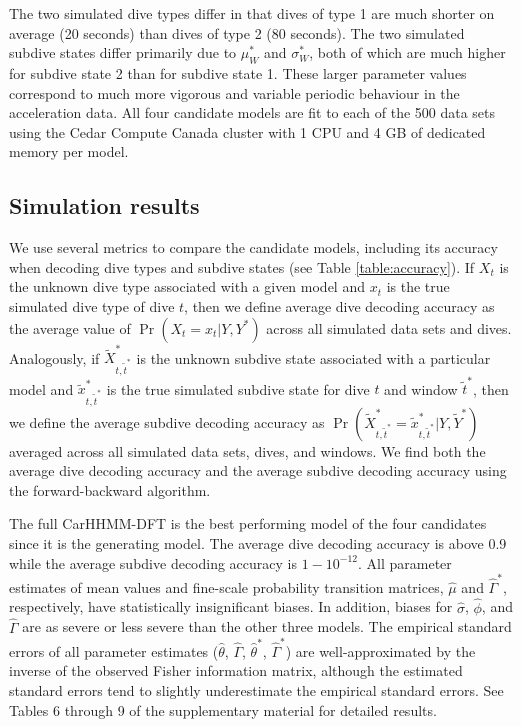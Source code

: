 The two simulated dive types differ in that dives of type 1 are much shorter on average (20 seconds) than dives of type 2 (80 seconds). The two simulated subdive states differ primarily due to $\mu_W^*$ and $\sigma_W^*$, both of which are much higher for subdive state 2 than for subdive state 1. These larger parameter values correspond to much more vigorous and variable periodic behaviour in the acceleration data. All four candidate models are fit to each of the 500 data sets using the Cedar Compute Canada cluster with 1 CPU and 4 GB of dedicated memory per model.

\subsection{Simulation results}

We use several metrics to compare the candidate models, including its accuracy when decoding dive types and subdive states (see Table \ref{table:accuracy}). If $X_t$ is the unknown dive type associated with a given model and $x_t$ is the true simulated dive type of dive $t$, then we define average dive decoding accuracy as the average value of $\Pr(X_{t} = x_{t}|Y,Y^*)$ across all simulated data sets and dives. Analogously, if $\tilde X^*_{t,\tilde t^*}$ is the unknown subdive state associated with a particular model and $\tilde x^*_{t,\tilde t^*}$ is the true simulated subdive state for dive $t$ and window $\tilde t^*$, then we define the average subdive decoding accuracy as $\Pr(\tilde X^*_{t,\tilde t^*} = \tilde x^*_{t,\tilde t^*}|Y,\tilde Y^*)$ averaged across all simulated data sets, dives, and windows. We find both the average dive decoding accuracy and the average subdive decoding accuracy using the forward-backward algorithm.

The full CarHHMM-DFT is the best performing model of the four candidates since it is the generating model. The average dive decoding accuracy is above 0.9 while the average subdive decoding accuracy is $1-10^{-12}$. All parameter estimates of mean values and fine-scale probability transition matrices, $\hat \mu$ and $\hat \Gamma^*$, respectively, have statistically insignificant biases. In addition, biases for $\hat \sigma$, $\hat \phi$, and $\hat \Gamma$ are as severe or less severe than the other three models. The empirical standard errors of all parameter estimates ($\hat \theta$, $\hat \Gamma$, $\hat \theta^*$, $\hat \Gamma^*$) are well-approximated by the inverse of the observed Fisher information matrix, although the estimated standard errors tend to slightly underestimate the empirical standard errors. See Tables 6 through 9 of the supplementary material for detailed results.

